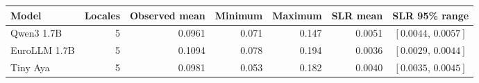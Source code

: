 \begin{tabular*}{\textwidth}{@{\extracolsep{\fill}}lrrrrrc@{}}
\toprule
Model & Locales & Observed mean & Minimum & Maximum & SLR mean & SLR 95\% range \\
\midrule
Qwen3 1.7B & 5 & 0.0961 & 0.071 & 0.147 & 0.0051 & $[0.0044,\,0.0057]$ \\
EuroLLM 1.7B & 5 & 0.1094 & 0.078 & 0.194 & 0.0036 & $[0.0029,\,0.0044]$ \\
Tiny Aya & 5 & 0.0981 & 0.053 & 0.182 & 0.0040 & $[0.0035,\,0.0045]$ \\
\bottomrule
\end{tabular*}
